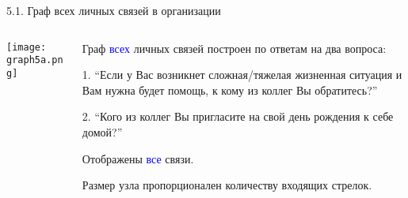 \begin{frame}{5.1. Граф всех личных связей в организации}

\begin{columns}
\begin{column}{0.75\textwidth} 
\centering
          \texttt{[image: graph5a.png]}
\end{column}
\begin{column}{0.25\textwidth}
\tiny
Граф \textcolor{blue}{всех} личных связей построен по ответам на два вопроса:
\smallskip

1. ``Если у Вас возникнет сложная/тяжелая жизненная ситуация и Вам нужна будет помощь, к кому из коллег Вы обратитесь?''
\smallskip

2. ``Кого из коллег Вы пригласите на свой день рождения к себе домой?''
\smallskip

Отображены \textcolor{blue}{все} связи. 
\smallskip

Размер узла пропорционален количеству входящих стрелок.

\end{column}
\end{columns}
\end{frame}


